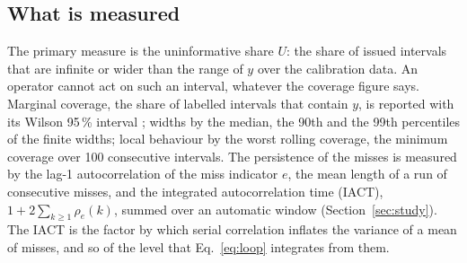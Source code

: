 \subsection{What is measured}\label{sec:loop:metrics}

The primary measure is the uninformative share $U$: the share of issued intervals that are
infinite or wider than the range of $y$ over the calibration data. An operator cannot act on
such an interval, whatever the coverage figure says. Marginal coverage, the share of labelled
intervals that contain $y$, is reported with its Wilson 95\,\% interval \citep{wilson1927};
widths by the median, the 90th and the 99th percentiles of the finite widths; local behaviour by
the worst rolling coverage, the minimum coverage over 100 consecutive intervals. The persistence
of the misses is measured by the lag-1 autocorrelation of the miss indicator $e$, the mean length
of a run of consecutive misses, and the integrated autocorrelation time (IACT),
$1 + 2\sum_{k \ge 1} \rho_e(k)$, summed over an automatic window (Section~\ref{sec:study}). The
IACT is the factor by which serial correlation inflates the variance of a mean of misses, and so
of the level that Eq.~\eqref{eq:loop} integrates from them.

